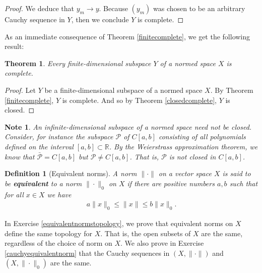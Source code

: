 \documentclass[11pt]{article}
\theoremstyle{mystyle}
\newtheorem{thm}{Theorem}[section]
\newtheorem{defn}{Definition}[section]
\newtheorem{note}{Note}[section]
\newcommand{\0}{\mathbf{0}}
\begin{document}
\begin{proof}
We deduce that $y_m \longrightarrow y$. Because $(y_m)$ was chosen to be an arbitrary Cauchy sequence in $Y$, then we conclude $Y$ is complete.
\end{proof}

As an immediate consequence of Theorem \ref{finitecomplete}, we get the following result:
\begin{thm}
Every finite-dimensional subspace $Y$ of a normed space $X$ is complete.
\end{thm}
\begin{proof}
Let $Y$ be a finite-dimensional subspace of a normed space $X$. By Theorem \ref{finitecomplete}, $Y$ is complete. And so by Theorem \ref{closedcomplete}, $Y$ is closed.
\end{proof}
\begin{note}
An infinite-dimensional subspace of a normed space need not be closed. Consider, for instance the subspace $\mathcal{P}$ of $C[a, b]$ consisting of all polynomials defined on the interval $[a, b] \subset \mathbb{R}$. By the Weierstrass approximation theorem, we know that $\bar{\mathcal{P}} = C[a, b]$ but $\mathcal{P} \neq C[a,b]$. That is, $\mathcal{P}$ is not closed in $C[a,b]$.
\end{note}

\begin{defn}[Equivalent norms]\label{equivalentnorms}
A norm $\|\cdot\|$ on a vector space $X$ is said to be \textbf{equivalent} to a norm $\|\cdot\|_0$ on $X$ if there are positive numbers $a, b$ such that for all $x \in X$ we have
\begin{align*}
    a\|x\|_0 \leq \|x\| \leq b\|x\|_0.
\end{align*}
\end{defn}
In Exercise \ref{equivalentnormstopology}, we prove that equivalent norms on $X$ define the same topology for $X$. That is, the open subsets of $X$ are the same, regardless of the choice of norm on $X$. We also prove in Exercise \ref{cauchyequivalentnorm} that the Cauchy sequences in $(X, \|\cdot\|)$ and $(X, \|\cdot\|_0)$ are the same.
\end{document}
